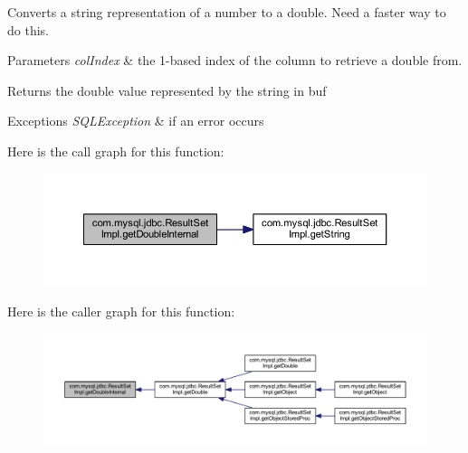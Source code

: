 Converts a string representation of a number to a double. Need a faster way to do this.


\begin{DoxyParams}{Parameters}
{\em col\+Index} & the 1-\/based index of the column to retrieve a double from.\\
\hline
\end{DoxyParams}
\begin{DoxyReturn}{Returns}
the double value represented by the string in buf
\end{DoxyReturn}

\begin{DoxyExceptions}{Exceptions}
{\em S\+Q\+L\+Exception} & if an error occurs \\
\hline
\end{DoxyExceptions}
Here is the call graph for this function\+:
\nopagebreak
\begin{figure}[H]
\begin{center}
\leavevmode
\includegraphics[width=350pt]{classcom_1_1mysql_1_1jdbc_1_1_result_set_impl_a23dad19b24da58f74652e22ac3fb4283_cgraph}
\end{center}
\end{figure}
Here is the caller graph for this function\+:
\nopagebreak
\begin{figure}[H]
\begin{center}
\leavevmode
\includegraphics[width=350pt]{classcom_1_1mysql_1_1jdbc_1_1_result_set_impl_a23dad19b24da58f74652e22ac3fb4283_icgraph}
\end{center}
\end{figure}
\mbox{\label{classcom_1_1mysql_1_1jdbc_1_1_result_set_impl_afc961b03d47113ee8d5b329ec333ad3d}} 
